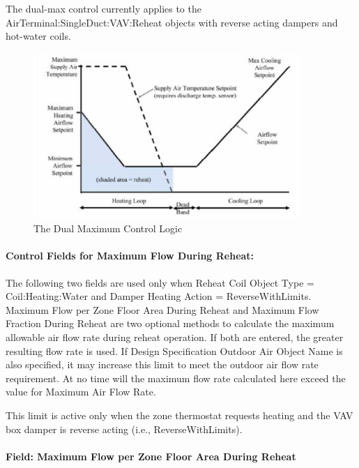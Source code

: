 The dual-max control currently applies to the AirTerminal:SingleDuct:VAV:Reheat objects with reverse acting dampers and hot-water coils.

\begin{figure}[hbtp] %
\centering
\includegraphics[width=0.9\textwidth, height=0.9\textheight, keepaspectratio=true]{media/image265.png}
\caption{  The Dual Maximum Control Logic \protect \label{fig:the-dual-maximum-control-logic}}
\end{figure}

\paragraph{Control Fields for Maximum Flow During Reheat:}\label{control-fields-for-maximum-flow-during-reheat}

The following two fields are used only when Reheat Coil Object Type = Coil:Heating:Water and Damper Heating Action = ReverseWithLimits. Maximum Flow per Zone Floor Area During Reheat and Maximum Flow Fraction During Reheat are two optional methods to calculate the maximum allowable air flow rate during reheat operation. If both are entered, the greater resulting flow rate is used. If Design Specification Outdoor Air Object Name is also specified, it may increase this limit to meet the outdoor air flow rate requirement. At no time will the maximum flow rate calculated here exceed the value for Maximum Air Flow Rate.

This limit is active only when the zone thermostat requests heating and the VAV box damper is reverse acting (i.e., ReverseWithLimits).

\paragraph{Field: Maximum Flow per Zone Floor Area During Reheat}\label{field-maximum-flow-per-zone-floor-area-during-reheat}

